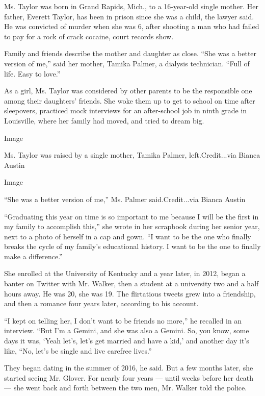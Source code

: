 Ms. Taylor was born in Grand Rapids, Mich., to a 16-year-old single
mother. Her father, Everett Taylor, has been in prison since she was a
child, the lawyer said. He was convicted of murder when she was 6, after
shooting a man who had failed to pay for a rock of crack cocaine, court
records show.

Family and friends describe the mother and daughter as close. ``She was
a better version of me,'' said her mother, Tamika Palmer, a dialysis
technician. ``Full of life. Easy to love.''

As a girl, Ms. Taylor was considered by other parents to be the
responsible one among their daughters' friends. She woke them up to get
to school on time after sleepovers, practiced mock interviews for an
after-school job in ninth grade in Louisville, where her family had
moved, and tried to dream big.

Image

Ms. Taylor was raised by a single mother, Tamika Palmer,
left.Credit...via Bianca Austin

Image

``She was a better version of me,'' Ms. Palmer said.Credit...via Bianca
Austin

``Graduating this year on time is so important to me because I will be
the first in my family to accomplish this,'' she wrote in her scrapbook
during her senior year, next to a photo of herself in a cap and gown.
``I want to be the one who finally breaks the cycle of my family's
educational history. I want to be the one to finally make a
difference.''

She enrolled at the University of Kentucky and a year later, in 2012,
began a banter on Twitter with Mr. Walker, then a student at a
university two and a half hours away. He was 20, she was 19. The
flirtatious tweets grew into a friendship, and then a romance four years
later, according to his account.

``I kept on telling her, I don't want to be friends no more,'' he
recalled in an interview. ``But I'm a Gemini, and she was also a Gemini.
So, you know, some days it was, `Yeah let's, let's get married and have
a kid,' and another day it's like, ``No, let's be single and live
carefree lives.''

They began dating in the summer of 2016, he said. But a few months
later, she started seeing Mr. Glover. For nearly four years --- until
weeks before her death --- she went back and forth between the two men,
Mr. Walker told the police.

